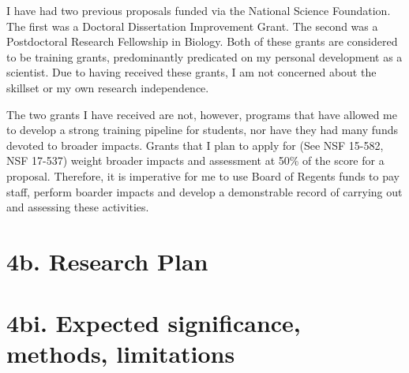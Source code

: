\documentclass[12pt]{article}
\begin{document}
I have had two previous proposals funded via the National Science Foundation.
The first was a Doctoral Dissertation Improvement Grant.
The second was a Postdoctoral Research Fellowship in Biology.
Both of these grants are considered to be training grants, predominantly predicated on my personal development as a scientist.
Due to having received these grants, I am not concerned about the skillset or my own research independence. \par
The two grants I have received are not, however, programs that have allowed me to develop a strong training pipeline for students, nor have they had many funds devoted to broader impacts. 
Grants that I plan to apply for (See NSF 15-582, NSF 17-537) weight broader impacts and assessment at 50\% of the score for a proposal. 
Therefore, it is imperative for me to use Board of Regents funds to pay staff, perform boarder impacts and develop a demonstrable record of carrying out and assessing these activities. 
\par

\section*{4b. Research Plan}

\section*{4bi. Expected significance, methods, limitations}
\end{document}

